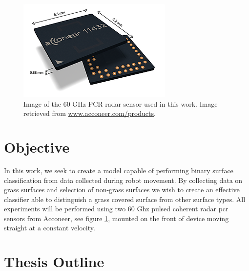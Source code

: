 










\begin{figure}
	\centering
	\includegraphics[scale=0.8]{figs_temp/acc_sensor}
	\caption{Image of the 60 GHz PCR radar sensor used in this work. Image retrieved from \url{www.acconeer.com/products}.}
	\label{fig:acc_sens}
\end{figure}


\section{Objective}

In this work, we seek to create a model capable of performing binary surface classification from data collected during robot movement. By collecting data on grass surfaces and selection of non-grass surfaces we wish to create an effective classifier able to distinguish a grass covered surface from other surface types. All experiments will be performed using two 60 Ghz pulsed coherent radar \gls{pcr} sensors from Acconeer, see figure \ref{fig:acc_sens},  mounted on the front of device moving straight at a constant velocity. 

\section{Thesis Outline}

